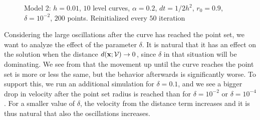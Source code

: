 \begin{figure}
    \begin{center}
    \end{center}
    \vspace{-2.5em}
    \caption[Model 2- Circular example, $\alpha=0.2$]{Model 2: $h=0.01$, $10$ level curves, $\alpha=0.2$, $dt=1/2 h^2$, $r_0=0.9$, $\delta=10^{-2}$, $200$ points. Reinitialized every $50$ iteration}
    \label{fig:model2-circle-a02}
\end{figure}

Considering the large oscillations after the curve has reached the point set, we want to analyze the effect of the parameter $\delta$. It is natural that it has an effect on the solution when the distance $d(\textbf{x};\mathcal{V}) \to 0$, since $\delta$ in that situation will be dominating. We see from  that the movement up until the curve reaches the point set is more or less the same, but the behavior afterwards is significantly worse. To support this, we run an additional simulation for $\delta=0.1$, and we see a bigger drop in velocity after the point set radius is reached than for $\delta=10^{-2}$ or $\delta=10^{-4}$. For a smaller value of $\delta$, the velocity from the distance term increases and it is thus natural that also the oscillations increases. 

